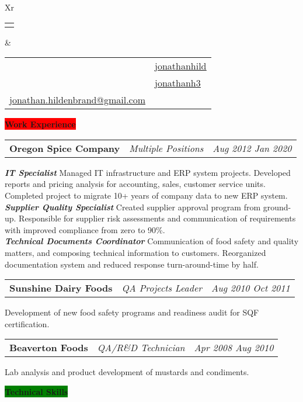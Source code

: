 \documentclass[letterpaper,12pt]{article}[leftmargin=*]
\makeatletter
\def\fullname{Jonathan Hildenbrand}
\def\githubicon{\faGithub}
\def\githublink{https://github.com/jonathanhild}
\def\githubtext{jonathanhild}
\def\linkedinicon{\faLinkedin}
\def\linkedinlink{https://linkedin.com/in/jonathanh3}
\def\linkedintext{jonathanh3}
\def\phoneicon{\faPhone}
\def\phonetext{+1-971-409-0695}
\def\emailicon{\faEnvelope}
\def\emaillink{mailto:jonathan.hildenbrand+resume@gmail.com}
\def\emailtext{jonathan.hildenbrand@gmail.com}
\def\locationicon{\faMapMarker}
\def\locationtext{Portland, Oregon}
\def\targeticon{\faBinoculars}
\def\targettext{Local \& Remote}
\def\headertype{\doublecol} %
\def\location{\hspace{3pt}\locationicon \hspace{5pt}{\color{links}\locationtext}}
\def\target{\targeticon\hspace{3pt}{\color{links}\targettext}}
\def\phone{\phoneicon\hspace{3pt}{\color{links}{\phonetext}}}
\def\linkedin{\linkedinicon\hspace{3pt}\href{\linkedinlink}{\underline{\linkedintext}}}
\def\email{\emailicon\hspace{3pt}\href{\emaillink}{\underline{\emailtext}}}
\def\github{\githubicon\hspace{3pt}\href{\githublink}{\underline{\githubtext}}}
\newcommand{\skills}[2]{\vspace{4pt}
  \colorbox{Green}{\color{white}#1\hspace{9pt}\raggedbottom\normalsize\textbf{#2\hspace{4pt}}}
}
\newcommand{\experience}[2]{\vspace{4pt}
  \colorbox{Red}{\color{white}#1\hspace{9pt}\raggedbottom\normalsize\textbf{#2\hspace{4pt}}}
}
\newcommand{\resumeSectionStart}{\begin{itemize}[leftmargin=0.1in]}
\newcommand{\resumeSectionEnd}{\end{itemize}}
\newcommand{\resumeExperience}[3]{
  \vspace{-6pt}
  \item[]
    \begin{tabularx}{0.97\textwidth}{>{\raggedright}X >{\raggedright\arraybackslash}X >{\raggedleft\arraybackslash}X}
      \textbf{\color{primary}#1} & \textit{\color{accent}#2} & \textit{\color{accent}\small#3} \\
  \end{tabularx}
    
}
\newcommand{\doublecol}[6]{
  \begin{tabularx}{\textwidth}{Xr}
    {
      \begin{tabular}[c]{l}
        \fontsize{24}{34}\selectfont{\color{primary}{{\textbf{\fullname}}}}
      \end{tabular}
    } & {
      \begin{tabular}[c]{l@{\hspace{1.5em}} l}
        {\small#4} & {\small#1} \\
        {\small#5} & {\small#2} \\
        {\small#6} & {\small#3}
      \end{tabular}
    }
  \end{tabularx}
}
\newcommand{\singlecol}[6]{
  \begin{tabularx}{\textwidth}{Xr}
    {
      \begin{tabular}[b]{l}
        \fontsize{35}{45}\selectfont{\color{primary}{{\textbf{\fullname}}}} \\
        {\textit{\subtitle}} %
      \end{tabular}
    } & {
      \begin{tabular}[c]{l}
        {\small#1} \\
        {\small#2} \\
        {\small#3} \\
        {\small#4} \\
        {\small#5} \\
        {\small#6}
      \end{tabular}
    }
  \end{tabularx}
}
\makeatother
\begin{document}
\headertype{\github}{\linkedin}{\phone}{\location}{\target}{\email} %

\experience{\faPieChart}{Work Experience}

\resumeSectionStart{\resumeExperience{Oregon Spice Company}{Multiple Positions}{Aug 2012 \textemdash{} Jan 2020}\textbf{\textit{\color{accent}IT Specialist}} \textemdash{} Managed IT infrastructure and ERP system projects. Developed reports and pricing analysis for accounting, sales, customer service units. Completed project to migrate 10+ years of company data to new ERP system.\\ \textbf{\textit{\color{accent}Supplier Quality Specialist}} \textemdash{} Created supplier approval program from ground-up. Responsible for supplier risk assessments and communication of requirements with improved compliance from zero to 90\%. \\ \textbf{\textit{\color{accent}Technical Documents Coordinator}} \textemdash{} Communication of food safety and quality matters, and composing technical information to customers. Reorganized documentation system and reduced response turn-around-time by half.}\vspace{-6pt}\resumeSectionEnd{}
\resumeSectionStart{\resumeExperience{Sunshine Dairy Foods}{QA Projects Leader}{Aug 2010 \textemdash{} Oct 2011}Development of new food safety programs and readiness audit for SQF certification.}\vspace{-6pt}\resumeSectionEnd{}
\resumeSectionStart{\resumeExperience{Beaverton Foods}{QA/R\&D Technician}{Apr 2008 \textemdash{} Aug 2010}Lab analysis and product development of mustards and condiments.}\vspace{-6pt}\resumeSectionEnd{}


\skills{\faGears}{Technical Skills}
\end{document}
